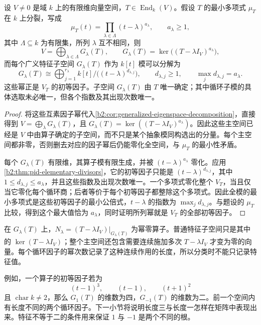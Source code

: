 \begin{proposition}\label{b2:prop:jordan-splitting-primary}
	设 \(V\ne0\) 是域 \(k\) 上的有限维向量空间，\(T\in\operatorname{End}_k(V)\)。假设 \(T\) 的最小多项式 \(\mu_T\) 在 \(k\) 上分裂，写成
	\[
		\mu_T(t)=\prod_{\lambda\in\Lambda}(t-\lambda)^{a_\lambda}, \qquad a_\lambda\ge1,
	\]
	其中 \(\Lambda\subseteq k\) 为有限集，所列 \(\lambda\) 互不相同，则
	\[
		V=\bigoplus_{\lambda\in\Lambda}G_\lambda(T), \qquad G_\lambda(T)=\ker\bigl((T-\lambda I_V)^{a_\lambda}\bigr),
	\]
	而每个广义特征子空间 \(G_\lambda(T)\) 作为 \(k[t]\) 模可以分解为
	\[
		G_\lambda(T)\cong \bigoplus_{j=1}^{r_\lambda}k[t]/\bigl((t-\lambda)^{d_{\lambda,j}}\bigr), \qquad d_{\lambda,j}\ge1, \qquad \max_j d_{\lambda,j}=a_\lambda.
	\]
	这些幂正是 \(V_T\) 的初等因子。子空间 \(G_\lambda(T)\) 由 \(T\) 唯一确定；其中循环子模的具体选取未必唯一，但各个指数及其出现次数唯一。
\end{proposition}
\begin{proof}
	将这些互素因子幂代入\cref{b2:cor:generalized-eigenspace-decomposition}，直接得到 \(V=\bigoplus_\lambda G_\lambda(T)\)，且 \(G_\lambda(T)=\ker((T-\lambda I_V)^{a_\lambda})\)。因此这些主空间已经是 \(V\) 中由算子确定的子空间，而不只是某个抽象模同构选出的分量。每个主空间都非零，否则删去对应的因子幂后仍能零化全空间，与 \(\mu_T\) 的最小性矛盾。

	每个 \(G_\lambda(T)\) 有限维，其算子模有限生成，并被 \((t-\lambda)^{a_\lambda}\) 零化。应用\cref{b2:thm:pid-elementary-divisors}，它的初等因子只能是 \((t-\lambda)^{d_{\lambda,j}}\)，其中 \(1\le d_{\lambda,j}\le a_\lambda\)，并且这些指数及出现次数唯一。一个多项式零化整个 \(V_T\)，当且仅当它零化每个循环商；后者等价于每个初等因子都整除这个多项式。因此全模的最小多项式是这些初等因子的最小公倍式，\(t-\lambda\) 的指数为 \(\max_jd_{\lambda,j}\)。与题设的 \(\mu_T\) 比较，得到这个最大值恰为 \(a_\lambda\)，同时证明所列幂就是 \(V_T\) 的全部初等因子。
\end{proof}

在 \(G_\lambda(T)\) 上，\(N_\lambda=(T-\lambda I_V)|_{G_\lambda(T)}\) 为幂零算子。普通特征子空间只是其中的 \(\ker(T-\lambda I_V)\)；整个主空间还包含需要连续施加多次 \(T-\lambda I_V\) 才变为零的向量。每个循环因子的幂次数记录了这种连续作用的长度，所以分类时不能只记录特征值。

\ProseParagraphBreak
例如，一个算子的初等因子若为
\[
	(t-1)^3,\qquad (t-1),\qquad (t+1)^2
\]
且 \(\operatorname{char}k\ne2\)，那么 \(G_1(T)\) 的维数为四，\(G_{-1}(T)\) 的维数为二。前一个空间内有长度不同的两个循环因子。下一小节将说明长度三与长度一怎样在矩阵中表现出来。特征不等于二的条件用来保证 \(1\) 与 \(-1\) 是两个不同的根。

